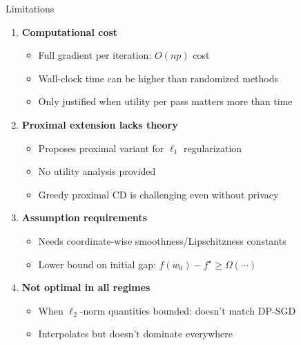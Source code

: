 \documentclass[10pt]{beamer}
\begin{document}
\begin{frame}{Limitations}
\begin{enumerate}
\item \textbf{Computational cost}
\begin{itemize}
\item Full gradient per iteration: $O(np)$ cost
\item Wall-clock time can be higher than randomized methods
\item Only justified when utility per pass matters more than time
\end{itemize}

\item \textbf{Proximal extension lacks theory}
\begin{itemize}
\item Proposes proximal variant for $\ell_1$ regularization
\item \alert{No utility analysis provided}
\item Greedy proximal CD is challenging even without privacy
\end{itemize}

\item \textbf{Assumption requirements}
\begin{itemize}
\item Needs coordinate-wise smoothness/Lipschitzness constants
\item Lower bound on initial gap: $f(w_0) - f^\star \geq \Omega(\cdots)$
\end{itemize}

\item \textbf{Not optimal in all regimes}
\begin{itemize}
\item When $\ell_2$-norm quantities bounded: doesn't match DP-SGD
\item Interpolates but doesn't dominate everywhere
\end{itemize}
\end{enumerate}
\end{frame}
\end{document}
